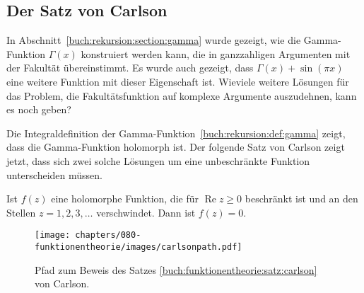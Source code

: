 %
%
%
\subsection{Der Satz von Carlson
\label{buch:funktionentheorie:subsection:satz-von-carlson}}
In Abschnitt~\ref{buch:rekursion:section:gamma} wurde gezeigt,
wie die Gamma-Funktion $\Gamma(x)$ konstruiert werden kann, die
in ganzzahligen Argumenten mit der Fakultät übereinstimmt.
Es wurde auch gezeigt, dass $\Gamma(x)+\sin(\pi x)$ eine
weitere Funktion mit dieser Eigenschaft ist.
Wieviele weitere Lösungen für das Problem, die Fakultätsfunktion
auf komplexe Argumente auszudehnen, kann es noch geben?

Die Integraldefinition der
Gamma-Funktion~\ref{buch:rekursion:def:gamma} zeigt, dass
die Gamma-Funktion holomorph ist.
Der folgende Satz von Carlson zeigt jetzt, dass sich
zwei solche Lösungen um eine unbeschränkte Funktion
unterscheiden müssen.

\begin{satz}[Carlson]
\label{buch:funktionentheorie:satz:carlson}
Ist $f(z)$ eine holomorphe Funktion, die für $\operatorname{Re}z\ge 0$
beschränkt ist und an den Stellen $z=1,2,3,\dots$ verschwindet.
Dann ist $f(z)=0$.
\end{satz}

%
%
\begin{figure}
\centering
\texttt{[image: chapters/080-funktionentheorie/images/carlsonpath.pdf]}
\caption{Pfad zum Beweis des Satzes \ref{buch:funktionentheorie:satz:carlson}
von Carlson.
\label{buch:funktionentheorie:fig:carlsonpath}}
\end{figure}

